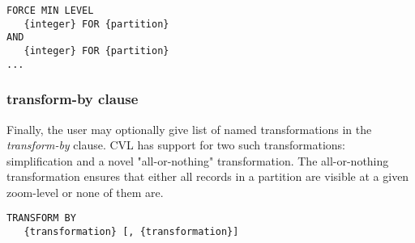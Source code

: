 \begin{lstlisting}
FORCE MIN LEVEL
   {integer} FOR {partition}
AND
   {integer} FOR {partition}
...
\end{lstlisting}

\subsubsection{transform-by clause}

Finally, the user may optionally give list of named transformations in the \emph{transform-by} clause. CVL has support for two such transformations: simplification and a novel "all-or-nothing" transformation. The all-or-nothing transformation ensures that either all records in a partition are visible at a given zoom-level or none of them are.

\begin{lstlisting}
TRANSFORM BY
   {transformation} [, {transformation}]
\end{lstlisting}

